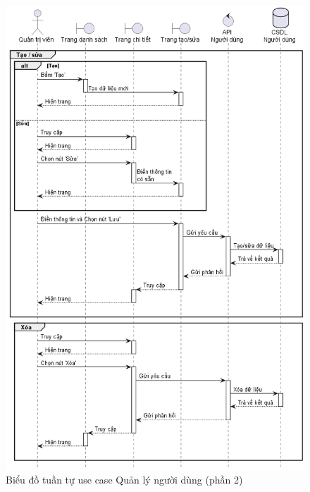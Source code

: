 \documentclass[../DoAn.tex]{subfiles}
\begin{document}
\begin{figure}[H]
    \centering
    \includegraphics[width=1\textwidth]{Hinhve/sequences/UserManage2.png}
    \caption{Biểu đồ tuần tự use case Quản lý người dùng (phần 2)}
    \label{figure:sd-user-manage2}
\end{figure}
\break
\end{document}
